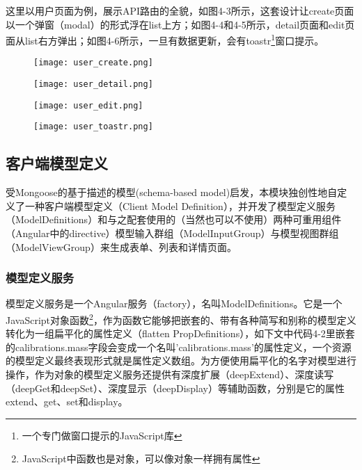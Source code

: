 这里以用户页面为例，展示API路由的全貌，如图4-3所示，这套设计让create页面以一个弹窗（modal）的形式浮在list上方；如图4-4和4-5所示，detail页面和edit页面从list右方弹出；如图4-6所示，一旦有数据更新，会有toastr\footnote{一个专门做窗口提示的JavaScript库}窗口提示。
\begin{figure}[H]
 \centering
 \texttt{[image: user\_create.png]}
\end{figure}
\begin{figure}[H]
 \centering
 \texttt{[image: user\_detail.png]}
\end{figure}
\begin{figure}[H]
 \centering
 \texttt{[image: user\_edit.png]}
\end{figure}
\begin{figure}[H]
 \centering
 \texttt{[image: user\_toastr.png]}
\end{figure}

\subsection{客户端模型定义}
受Mongoose的基于描述的模型(schema-based model)启发，本模块独创性地自定义了一种客户端模型定义（Client Model Definition），并开发了模型定义服务（ModelDefinitions）和与之配套使用的（当然也可以不使用）两种可重用组件（Angular中的directive）模型输入群组（ModelInputGroup）与模型视图群组（ModelViewGroup）来生成表单、列表和详情页面。

\subsubsection{模型定义服务}
模型定义服务是一个Angular服务（factory），名叫ModelDefinitions。它是一个JavaScript对象函数\footnote{JavaScript中函数也是对象，可以像对象一样拥有属性}，作为函数它能够把嵌套的、带有各种简写和别称的模型定义转化为一组扁平化的属性定义（flatten PropDefinitions），如下文中代码4-2里嵌套的calibrations.mass字段会变成一个名叫'calibrations.mass'的属性定义，一个资源的模型定义最终表现形式就是属性定义数组。为方便使用扁平化的名字对模型进行操作，作为对象的模型定义服务还提供有深度扩展（deepExtend）、深度读写（deepGet和deepSet）、深度显示（deepDisplay）等辅助函数，分别是它的属性extend、get、set和display。

